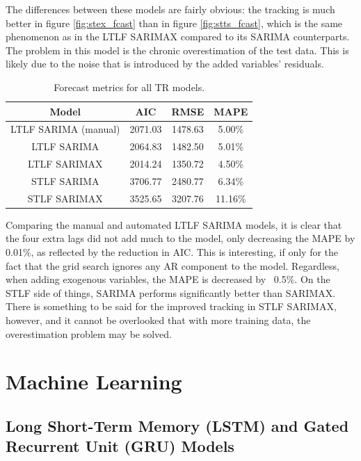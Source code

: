 \documentclass[12pt]{scrreprt}
\begin{document}
The differences between these models are fairly obvious: the tracking is much better in figure \ref{fig:stex_fcast} than in figure \ref{fig:stts_fcast}, which is the same phenomenon as in the LTLF SARIMAX compared to its SARIMA counterparts. The problem in this model is the chronic overestimation of the test data. This is likely due to the noise that is introduced by the added variables' residuals.

\begin{table}[h!]
    \centering
    \begin{tabular}[h!]{|c|c c c|}
        \hline
        Model & AIC & RMSE & MAPE \\
        \hline
        LTLF SARIMA (manual) & 2071.03 & 1478.63 & 5.00\%\\
        \hline
        LTLF SARIMA & 2064.83 & 1482.50 & 5.01\%\\
        \hline
        LTLF SARIMAX & 2014.24 & 1350.72 & 4.50\%\\
        \hline
        STLF SARIMA & 3706.77 & 2480.77 & 6.34\%\\
        \hline
        STLF SARIMAX & 3525.65 & 3207.76 & 11.16\%\\
        \hline
    \end{tabular}
    \caption{Forecast metrics for all TR models.}
    \label{tab:tr_metrics}
\end{table}

Comparing the manual and automated LTLF SARIMA models, it is clear that the four extra lags did not add much to the model, only decreasing the MAPE by 0.01\%, as reflected by the reduction in AIC. This is interesting, if only for the fact that the grid search ignores any AR component to the model. Regardless, when adding exogenous variables, the MAPE is decreased by ~0.5\%. On the STLF side of things, SARIMA performs significantly better than SARIMAX. There is something to be said for the improved tracking in STLF SARIMAX, however, and it cannot be overlooked that with more training data, the overestimation problem may be solved.

\chapter{Machine Learning}

\section{Long Short-Term Memory (LSTM) and Gated Recurrent Unit (GRU) Models}
\end{document}
